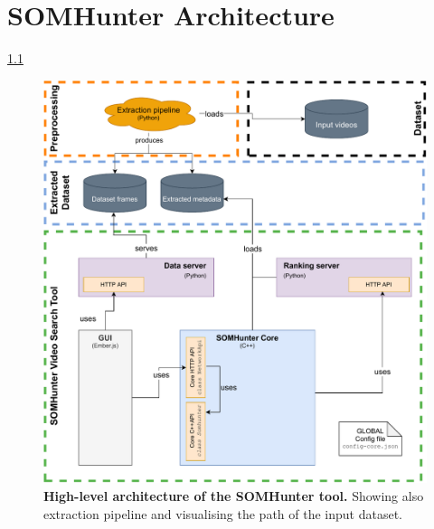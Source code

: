 \chapter{SOMHunter Architecture}
\label{arch}

\cref{fig:sh_arch}



\begin{figure}[b]
	\centering
	\includegraphics[width=1.0\textwidth]{img/diagrams/sh-arch.pdf}
	\caption{\textbf{High-level architecture of the SOMHunter tool.} Showing also extraction pipeline and visualising the path of the input dataset.}
	\label{fig:sh_arch}
\end{figure}
